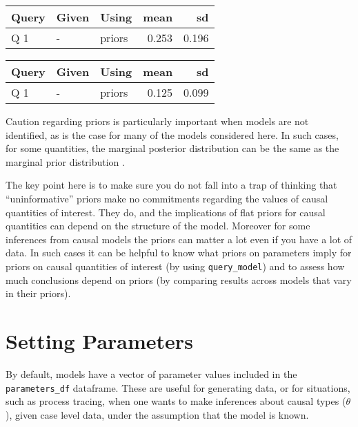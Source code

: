 \documentclass[
  12pt,
]{book}
\newenvironment{Shaded}{\begin{snugshade}}{\end{snugshade}}
\newcommand{\DataTypeTok}[1]{\textcolor[rgb]{0.13,0.29,0.53}{#1}}
\newcommand{\DecValTok}[1]{\textcolor[rgb]{0.00,0.00,0.81}{#1}}
\newcommand{\KeywordTok}[1]{\textcolor[rgb]{0.13,0.29,0.53}{\textbf{#1}}}
\newcommand{\NormalTok}[1]{#1}
\newcommand{\OperatorTok}[1]{\textcolor[rgb]{0.81,0.36,0.00}{\textbf{#1}}}
\newcommand{\StringTok}[1]{\textcolor[rgb]{0.31,0.60,0.02}{#1}}
\begin{document}
\begin{tabular}{l|l|l|r|r}
\hline
Query & Given & Using & mean & sd\\
\hline
Q 1 & - & priors & 0.253 & 0.196\\
\hline
\end{tabular}

\begin{Shaded}
\end{Shaded}

\begin{tabular}{l|l|l|r|r}
\hline
Query & Given & Using & mean & sd\\
\hline
Q 1 & - & priors & 0.125 & 0.099\\
\hline
\end{tabular}

Caution regarding priors is particularly important when models are not identified, as is the case for many of the models considered here. In such cases, for some quantities, the marginal posterior distribution can be the same as the marginal prior distribution \citep{poirier1998revising}.

The key point here is to make sure you do not fall into a trap of thinking that ``uninformative'' priors make no commitments regarding the values of causal quantities of interest. They do, and the implications of flat priors for causal quantities can depend on the structure of the model. Moreover for some inferences from causal models the priors can matter a lot even if you have a lot of data. In such cases it can be helpful to know what priors on parameters imply for priors on causal quantities of interest (by using \texttt{query\_model}) and to assess how much conclusions depend on priors (by comparing results across models that vary in their priors).

\hypertarget{parameters}{%
\section{Setting Parameters}\label{parameters}}

By default, models have a vector of parameter values included in the \texttt{parameters\_df} dataframe. These are useful for generating data, or for situations, such as process tracing, when one wants to make inferences about causal types (\(\theta\)), given case level data, under the assumption that the model is known.
\end{document}
